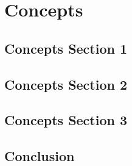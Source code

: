 %
\chapter{Concepts}
\label{sec:concepts}


\Blindtext[2][1]

\section{Concepts Section 1}
\label{sec:concepts:sec1}

\Blindtext[2][2]

\section{Concepts Section 2}
\label{sec:concepts:sec2}

\Blindtext[3][2]

\section{Concepts Section 3}
\label{sec:concepts:sec3}

\Blindtext[4][2]

\section{Conclusion}
\label{sec:concepts:conclusion}

\Blindtext[2][1]
